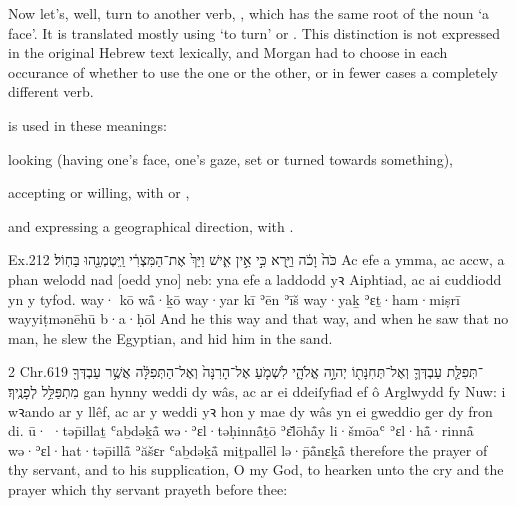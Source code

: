 
\begin{paper}
	Now let’s, well, turn to another verb, , which has the same root of the noun  ‘a face’. It is translated mostly using  ‘to turn’ or . This distinction is not expressed in the original Hebrew text lexically, and Morgan had to choose in each occurance of  whether to use the one or the other, or in fewer cases a completely different verb.
\end{paper}

\begin{paper}
	 is used in these meanings:
	\begin{compactitem}
		\item looking (having one’s face, one’s gaze, set or turned towards something),
		\item accepting or willing, with  or ,
		\item and expressing a geographical direction, with .
	\end{compactitem}
\end{paper}

\begin{example}{Ex.}{2}{12}{}{}
	\quoling
	{ כֹּה֙ וָכֹ֔ה וַיַּ֖רְא כִּ֣י אֵ֣ין אִ֑ישׁ וַיַּךְ֙ אֶת־הַמִּצְרִ֔י וַֽיִּטְמְנֵ֖הוּ בַּחֽוֹל׃}
	{Ac efe a  ymma, ac accw, a phan welodd nad [oedd yno] neb: yna efe a laddodd yꝛ Aiphtiad, ac ai cuddiodd yn y tyfod.}
	{way· kō wå̄·ḵō way·yar kī ʾēn ʾīš way·yaḵ ʾɛṯ·ham·miṣrī wayyiṭmənēhū b·a·ḥōl}
	{And he  this way and that way, and when he saw that  no man, he slew the Egyptian, and hid him in the sand.}
\end{example}

\begin{example}{2 Chr.}{6}{19}{}{}
	\quoling
	{ ־תְּפִלַּ֧ת עַבְדְּךָ֛ וְאֶל־תְּחִנָּת֖וֹ יְהוָ֣ה אֱלֹהָ֑י לִשְׁמֹ֤עַ אֶל־הָרִנָּה֙ וְאֶל־הַתְּפִלָּ֔ה אֲשֶׁ֥ר עַבְדְּךָ֖ מִתְפַּלֵּ֥ל לְפָנֶֽיךָ׃}
	{ gan hynny  weddi dy wâs, ac ar ei ddeiſyfiad ef ô Arglwydd fy Nuw: i wꝛando ar y llêf, ac ar y weddi yꝛ hon y mae dy wâs yn ei gweddio ger dy fron di.}
	{ū· ·təp̄illaṯ ʿaḇdəḵå̄ wə·ʾɛl·təḥinnå̄ṯō {\YHWH} ʾɛ̆lōhå̄y li·šmōaʿ ʾɛl·hå̄·rinnå̄ wə·ʾɛl·hat·təp̄illå̄ ʾăšɛr ʿaḇdəḵå̄ miṯpallēl lə·p̄å̄nɛḵå̄}
	{ therefore  the prayer of thy servant, and to his supplication, O {\LORD} my God, to hearken unto the cry and the prayer which thy servant prayeth before thee:}
\end{example}


